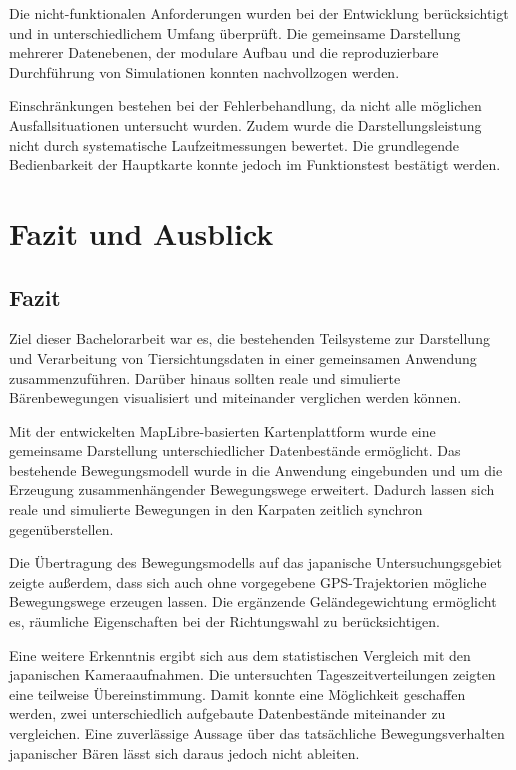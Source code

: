 \documentclass[12pt,a4paper]{report}
\begin{document}
Die nicht-funktionalen Anforderungen wurden
bei der Entwicklung berücksichtigt und
in unterschiedlichem Umfang überprüft.
Die gemeinsame Darstellung mehrerer
Datenebenen, der modulare Aufbau und
die reproduzierbare Durchführung von
Simulationen konnten nachvollzogen werden.

Einschränkungen bestehen bei der
Fehlerbehandlung, da nicht alle möglichen
Ausfallsituationen untersucht wurden.
Zudem wurde die Darstellungsleistung
nicht durch systematische Laufzeitmessungen
bewertet. Die grundlegende Bedienbarkeit
der Hauptkarte konnte jedoch im
Funktionstest bestätigt werden.




\chapter{Fazit und Ausblick}
\label{chap:fazit}

\section{Fazit}

Ziel dieser Bachelorarbeit war es, die
bestehenden Teilsysteme zur Darstellung
und Verarbeitung von Tiersichtungsdaten
in einer gemeinsamen Anwendung
zusammenzuführen. Darüber hinaus sollten
reale und simulierte Bärenbewegungen
visualisiert und miteinander verglichen
werden können.

Mit der entwickelten MapLibre-basierten
Kartenplattform wurde eine gemeinsame
Darstellung unterschiedlicher Datenbestände
ermöglicht. Das bestehende Bewegungsmodell
wurde in die Anwendung eingebunden und
um die Erzeugung zusammenhängender
Bewegungswege erweitert. Dadurch lassen
sich reale und simulierte Bewegungen
in den Karpaten zeitlich synchron
gegenüberstellen.

Die Übertragung des Bewegungsmodells
auf das japanische Untersuchungsgebiet
zeigte außerdem, dass sich auch ohne
vorgegebene GPS-Trajektorien mögliche
Bewegungswege erzeugen lassen.
Die ergänzende Geländegewichtung
ermöglicht es, räumliche Eigenschaften
bei der Richtungswahl zu berücksichtigen.

Eine weitere Erkenntnis ergibt sich
aus dem statistischen Vergleich mit
den japanischen Kameraaufnahmen.
Die untersuchten Tageszeitverteilungen
zeigten eine teilweise Übereinstimmung.
Damit konnte eine Möglichkeit geschaffen
werden, zwei unterschiedlich aufgebaute
Datenbestände miteinander zu vergleichen.
Eine zuverlässige Aussage über das
tatsächliche Bewegungsverhalten
japanischer Bären lässt sich daraus
jedoch nicht ableiten.
\end{document}
